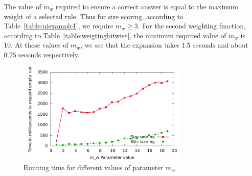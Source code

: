 \documentclass{sig-alternate}
\newcounter{prob}
\begin{document}
The value of $m_w$ required to ensure a correct answer is equal to the maximum weight of a selected rule. Thus for size scoring, according to Table~\ref{table:uiexample1}, we require $m_w \geq 3$. For the second weighting function, according to Table~\ref{table:weigtingbitwise}, the minimum required value of $m_w$ is $10$. At these values of $m_w$, we see that the expansion takes $1.5$ seconds and about $0.25$ seconds respectively. 

\begin{figure}
\hspace{-20pt}
  \includegraphics[height=2in]{graphs/mw_speed.pdf}%
\vspace{-10pt}
  \caption{Running time for different values of parameter $m_w$ \label{fig:mw_speed}}
\vspace{-13pt}
\end{figure}

\end{document}
